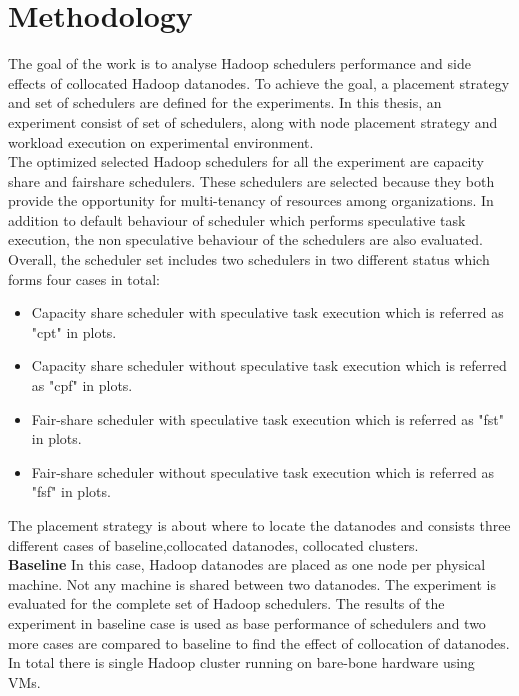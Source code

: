 \section{Methodology}

The goal of the work is to analyse Hadoop schedulers performance and side effects of collocated Hadoop datanodes. To achieve the goal, a placement strategy and set of schedulers are defined for the experiments. In this thesis, an experiment consist of set of schedulers, along with node placement strategy and workload execution on experimental environment. \\

The optimized selected Hadoop schedulers for all the experiment are capacity share and fairshare schedulers. These schedulers are selected because they both provide the opportunity for multi-tenancy of resources among organizations. In addition to default behaviour of scheduler which performs speculative task execution, the non speculative behaviour of the schedulers are also evaluated. Overall, the scheduler set includes two schedulers in two different status which forms four cases in total:\\
 \begin{itemize}
 \item{Capacity share scheduler with speculative task execution which is referred as "cpt" in plots.}
 \item{Capacity share scheduler without speculative task execution which is referred as "cpf" in plots.}
 \item{Fair-share scheduler with speculative task execution which is referred as "fst" in plots.}
 \item{Fair-share scheduler without speculative task execution which is referred as "fsf" in plots.}
 \end{itemize}
	
The placement strategy is about where to locate the datanodes and consists three different cases of baseline,collocated datanodes, collocated clusters.\\

\textbf{Baseline } In this case, Hadoop datanodes are placed as one node per physical machine. Not any machine is shared between two datanodes. The experiment is evaluated for the complete set of Hadoop schedulers. The results of the experiment in baseline case is used as base performance of schedulers and two more cases are compared to baseline to find the effect of collocation of datanodes.  In total there is single Hadoop cluster running on bare-bone hardware using VMs.\\ 
 
